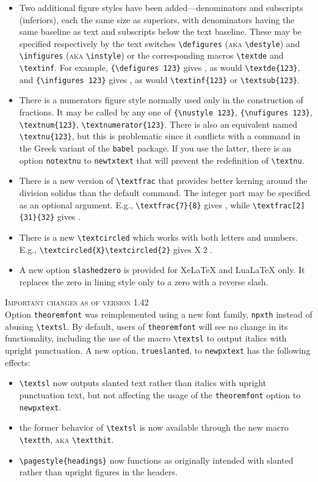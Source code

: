 \documentclass[11pt]{article}
\theoremstyle{oldplain}
\theoremstyle{plain}
\begin{document}
\begin{itemize}
\item Two additional figure styles have been added---denominators and subscripts (inferiors), each the same size as superiors, with denominators having the same baseline as text and subscripts below the text baseline.  These may be specified  respectively by the text switches \verb|\defigures| (\textsc{aka} \verb|\destyle|) and \verb|\infigures| (\textsc{aka} \verb|\instyle|) or the corresponding macros \verb|\textde| and  \verb|\textinf|. For example, \verb|{\defigures 123}| gives {}, as would \verb|\textde{123}|, and  \verb|{\infigures 123}| gives {}, as would \verb|\textinf{123}| or \verb|\textsub{123}|.
\item There is a numerators figure style normally used only in the construction of fractions. It may be called by any one of \verb|{\nustyle 123}|, \verb|{\nufigures 123}|, \verb|\textnum{123}|, \verb|\textnumerator{123}|. There is also an equivalent named \verb|\textnu{123}|, but this is problematic since it conflicts with a command in the Greek variant of the {\tt babel} package. If you use the latter, there is an option {\tt notextnu} to {\tt newtxtext} that will prevent the redefinition of \verb|\textnu|.
\item There is a new version of \verb|\textfrac| that provides better kerning around the division solidus than the default command. The integer part may be specified as an optional argument. E.g., \verb|\textfrac{7}{8}| gives , while \verb|\textfrac[2]{31}{32}| gives .

\item There is a new \verb|\textcircled| which works with both letters and numbers.\\
 E.g., \verb|\textcircled{X}\textcircled{2}| gives \textcircled{X}\textcircled{2}.
\item A new option {\tt slashedzero} is provided for XeLaTeX and LuaLaTeX only. It replaces the zero in lining style only to a zero with a reverse slash.
\end{itemize}

\textsc{Important changes as of version 1.42}\\
Option  {\tt theoremfont} was reimplemented using a new font family, {\tt npxth} instead of abusing \verb|\textsl|. By default,  users of {\tt theoremfont} will see no change in its functionality, including the use of the macro \verb|\textsl| to output italics with upright punctuation. A new option, {\tt trueslanted}, to {\tt newpxtext} has the following effects:
\begin{itemize}
\item
\verb|\textsl| now outputs slanted text rather than italics with upright punctuation text, but not affecting the usage of the {\tt theoremfont} option to {\tt newpxtext}.
\item the former behavior of \verb|\textsl| is now available through the new macro \verb|\textth|, \textsc{aka} \verb|\textthit|.
\item \verb|\pagestyle{headings}| now functions as originally intended with slanted rather than upright figures in the headers.
\end{itemize}
\end{document}
